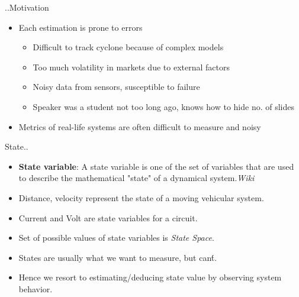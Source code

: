 \documentclass{beamer}
\begin{document}
\begin{frame}{..Motivation}

\begin{itemize}
  \item Each estimation is prone to errors
  \begin{itemize}
    \item Difficult to track cyclone because of complex models
    \item Too much volatility in markets due to external factors
    \item Noisy data from sensors, susceptible to failure
    \item Speaker was a student not too long ago, knows how to hide no. of slides
  \end{itemize}
  \item Metrics of real-life systems are often difficult to measure and noisy
\end{itemize}
\vskip 1cm
\end{frame}

\begin{frame}{State..}

\begin{itemize}
  \item \textbf{State variable}: A state variable is one of the set of variables that are used to describe the mathematical "state" of a dynamical system.\textit{Wiki}
  \item Distance, velocity represent the state of a moving vehicular system.
  \item Current and Volt are state variables for a circuit.
  \item Set of possible values of state variables is \textit{State Space}.
  \item States are usually what we want to measure, but can\'t.
  \item Hence we resort to estimating/deducing state value by observing system behavior.
\end{itemize}
\vskip 1cm
\end{frame}
\end{document}
